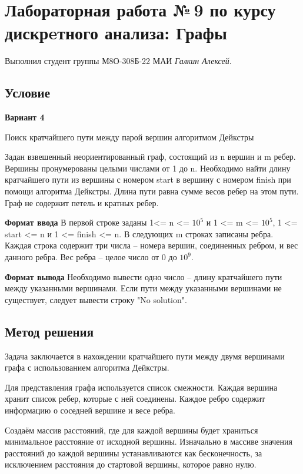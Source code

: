 \documentclass[12pt]{article}
\begin{document}
\section*{Лабораторная работа №\,9 по курсу дискрeтного анализа: Графы}

Выполнил студент группы М8О-308Б-22 МАИ \textit{Галкин Алексей}.

\subsection*{Условие}

\textbf{Вариант 4} 

Поиск кратчайшего пути между парой вершин алгоритмом Дейкстры

Задан взвешенный неориентированный граф, состоящий из n вершин и m ребер. Вершины пронумерованы целыми числами от 1 до n. Необходимо найти длину кратчайшего пути из вершины с номером start в вершину с номером finish при помощи алгоритма Дейкстры. Длина пути равна сумме весов ребер на этом пути. Граф не содержит петель и кратных ребер.

\textbf{Формат ввода}
В первой строке заданы 1<= n <= $10^5$ и 1 <= m <= $10^5$, 1 <= start  <= n и 1 <= finish <= n. В следующих m строках записаны ребра. Каждая строка содержит три числа – номера вершин, соединенных ребром, и вес данного ребра. Вес ребра – целое число от 0 до $10^9$. 

\textbf{Формат вывода}
Необходимо вывести одно число – длину кратчайшего пути между указанными вершинами. Если пути между указанными вершинами не существует, следует вывести строку "No solution".

\subsection*{Метод решения}

Задача заключается в нахождении кратчайшего пути между двумя вершинами графа с использованием алгоритма Дейкстры. 

Для представления графа используется список смежности. Каждая вершина хранит список ребер, которые с ней соединены. Каждое ребро содержит информацию о соседней вершине и весе ребра.

Создаём массив расстояний, где для каждой вершины будет храниться минимальное расстояние от исходной вершины. Изначально в массиве значения расстояний до каждой вершины устанавливаются как бесконечность, за исключением расстояния до стартовой вершины, которое равно нулю.
\end{document}
